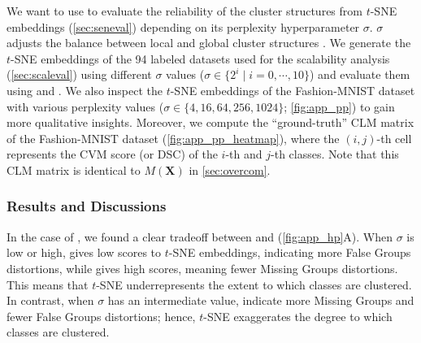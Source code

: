 We want to use \ltc to evaluate the reliability of the cluster structures from $t$-SNE embeddings (\autoref{sec:seneval}) depending on its perplexity hyperparameter $\sigma$. $\sigma$ adjusts the balance between local and global cluster structures \cite{wattenberg2016tsnetuning, cao17arxiv}. 
We generate the $t$-SNE embeddings of the 94 labeled datasets used for the scalability analysis   (\autoref{sec:scaleval})  using different $\sigma$ values ($\sigma \in \{2^i \mid i=0,\cdots, 10 \}$) and evaluate them using \ltc [\CHb{}] and \ltc [DSC].
We also inspect the $t$-SNE embeddings of the Fashion-MNIST \cite{xiao2017arxiv} dataset with various perplexity values ($\sigma \in \{4, 16, 64, 256, 1024\}$; \autoref{fig:app_pp}) to gain more qualitative insights.
Moreover, we compute the ``ground-truth'' CLM matrix of the Fashion-MNIST dataset (\autoref{fig:app_pp_heatmap}), where the $(i, j)$-th cell represents the CVM score (\CHb or DSC) of the $i$-th and $j$-th classes. Note that this CLM matrix is identical to $M(\mathbf{X})$ in \autoref{sec:overcom}. %

\subsubsection{Results and Discussions}


\newcommand{\greytext}[1]{\textcolor{gray}{#1}}
\newcommand{\orangetext}[1]{\textcolor{orange}{#1}}
\newcommand{\redtext}[1]{\textcolor{Red}{#1}}
\newcommand{\greentext}[1]{\textcolor{ForestGreen}{#1}}
\newcommand{\purpletext}[1]{\textcolor{Plum}{#1}}
\newcommand{\pinktext}[1]{\textcolor{VioletRed}{#1}}


In the case of \ltc [\CHb{}], we found a clear tradeoff between \lt and \lc (\autoref{fig:app_hp}A).
When $\sigma$ is low or high, \lt [\CHb{}] gives low scores to $t$-SNE embeddings, indicating more False Groups distortions, while \lc [\CHb{}] gives high scores, meaning fewer Missing Groups distortions. 
This means that $t$-SNE underrepresents the extent to which classes are clustered. %
In contrast, when $\sigma$ has an intermediate value, \ltc [\CHb{}] indicate more Missing Groups and fewer False Groups distortions; hence, $t$-SNE exaggerates the degree to which classes are clustered. 

